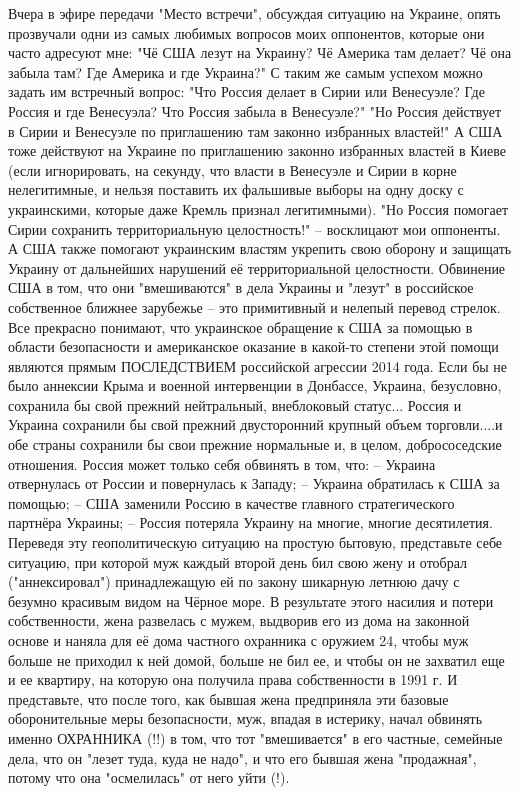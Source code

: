 Вчера в эфире передачи "Место встречи", обсуждая ситуацию на Украине, опять прозвучали одни из самых любимых вопросов моих оппонентов, которые они часто адресуют мне:
"Чё США лезут на Украину? Чё Америка там делает? Чё она забыла там? Где Америка и где Украина?"
С таким же самым успехом  можно задать им встречный вопрос: 
"Что Россия делает в Сирии или Венесуэле? Где Россия и где Венесуэла? Что Россия забыла в Венесуэле?"
"Но Россия действует в Сирии и Венесуэле по приглашению там законно избранных властей!"
А США тоже действуют на Украине по приглашению законно избранных властей в Киеве (если игнорировать, на секунду, что власти в Венесуэле и Сирии в корне нелегитимные, и нельзя поставить их фальшивые выборы на одну доску с украинскими, которые даже Кремль признал легитимными). 
"Но Россия помогает Сирии сохранить территориальную целостность!" – восклицают  мои оппоненты.
А США также помогают украинским властям укрепить свою оборону и защищать Украину от дальнейших нарушений её территориальной целостности. 
Обвинение США в том, что они "вмешиваются" в дела Украины и "лезут" в российское собственное ближнее зарубежье -- это примитивный и нелепый перевод стрелок. 
Все прекрасно понимают, что украинское обращение к США за помощью в области безопасности и американское оказание в какой-то степени этой помощи являются прямым ПОСЛЕДСТВИЕМ российской агрессии 2014 года. 
Если бы не было аннексии Крыма и военной интервенции в Донбассе, Украина, безусловно, сохранила бы свой прежний нейтральный, внеблоковый статус... Россия и Украина сохранили бы свой прежний двусторонний крупный объем торговли....и обе страны сохранили бы свои прежние нормальные и, в целом, добрососедские отношения.
Россия может только себя обвинять в том, что:
-- Украина отвернулась от России и повернулась к Западу;
-- Украина обратилась к США за помощью;
-- США заменили Россию в качестве главного стратегического партнёра Украины;
-- Россия потеряла Украину на многие, многие десятилетия. 
Переведя эту геополитическую ситуацию на простую бытовую, представьте себе ситуацию, при которой муж каждый второй день бил свою жену и отобрал ("аннексировал") принадлежащую ей по закону шикарную летнюю дачу с безумно красивым видом на Чёрное море. 
В результате этого насилия и потери собственности, жена развелась с мужем, выдворив его из дома на законной основе и наняла для её дома частного охранника с оружием 24\7, чтобы муж больше не приходил к ней домой, больше не бил ее, и чтобы он не захватил еще и ее квартиру, на которую она получила права собственности в 1991 г.
И представьте, что после того, как бывшая жена предприняла эти базовые оборонительные меры безопасности, муж, впадая в истерику, начал обвинять именно ОХРАННИКА (!!) в том, что тот "вмешивается" в его частные, семейные дела, что он "лезет туда, куда не надо", и что его бывшая жена "продажная", потому что она "осмелилась" от него уйти (!).
